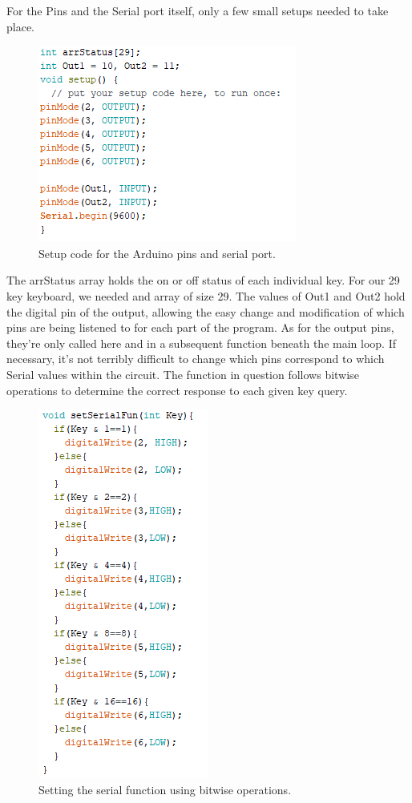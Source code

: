 For the Pins and the Serial port itself, only a few small setups needed to take place.

\begin{figure}[h!]
  \centering
  \includegraphics{image/arduinosetups.png}
  \caption{Setup code for the Arduino pins and serial port.}
\end{figure}

The arrStatus array holds the on or off status of each individual key. For our 29 key
keyboard, we needed and array of size 29. The values of Out1 and Out2 hold the digital pin
of the output, allowing the easy change and modification of which pins are being listened
to for each part of the program. As for the output pins, they’re only called here and in a
subsequent function beneath the main loop. If necessary, it’s not terribly difficult to
change which pins correspond to which Serial values within the circuit. The function in
question follows bitwise operations to determine the correct response to each given key
query.

\begin{figure}[h!]
  \centering
  \includegraphics{image/setserialfun.png}
  \caption{Setting the serial function using bitwise operations.}
\end{figure}

